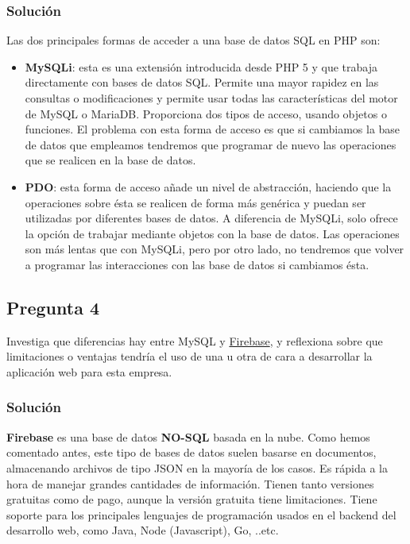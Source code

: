 \subsubsection{Solución}
Las dos principales formas de acceder a una base de datos SQL en PHP son:

\begin{itemize}
    \item \textbf{MySQLi}: esta es una extensión introducida desde PHP 5 y que trabaja directamente con bases de datos SQL. Permite una mayor rapidez en las consultas o modificaciones y permite usar todas las características del motor de MySQL o MariaDB. Proporciona dos tipos de acceso, usando objetos o funciones. El problema con esta forma de acceso es que si cambiamos la base de datos que empleamos tendremos que programar de nuevo las operaciones que se realicen en la base de datos.

    \item \textbf{PDO}: esta forma de acceso añade un nivel de abstracción, haciendo que la operaciones sobre ésta se realicen de forma más genérica y puedan ser utilizadas por diferentes bases de datos. A diferencia de MySQLi, solo ofrece la opción de trabajar mediante objetos con la base de datos. Las operaciones son más lentas que con MySQLi, pero por otro lado, no tendremos que volver a programar las interacciones con las base de datos si cambiamos ésta.
\end{itemize}

\subsection{Pregunta 4}
Investiga que diferencias hay entre MySQL y \href{https://firebase.google.com/?hl=es-419}{Firebase}, y reflexiona sobre que limitaciones o ventajas tendría el uso de una u otra de cara a desarrollar la aplicación web para esta empresa.

\subsubsection{Solución}
\textbf{Firebase} es una base de datos \textbf{NO-SQL} basada en la nube. Como hemos comentado antes, este tipo de bases de datos suelen basarse en documentos, almacenando archivos de tipo JSON en la mayoría de los casos. Es rápida a la hora de manejar grandes cantidades de información. Tienen tanto versiones gratuitas como de pago, aunque la versión gratuita tiene limitaciones. Tiene soporte para los principales lenguajes de programación usados en el backend del desarrollo web, como Java, Node (Javascript), Go, ..etc.

